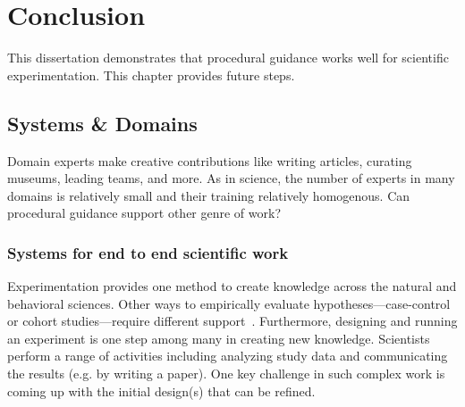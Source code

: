 
\chapter{Conclusion}

This dissertation demonstrates that procedural guidance works well for scientific experimentation. This chapter provides future steps.


\section{Systems \& Domains} 

Domain experts make creative contributions like writing articles, curating museums, leading teams, and more. As in science, the number of experts in many domains is relatively small and their training relatively homogenous.  Can procedural guidance support other genre of work?

\subsection{Systems for end to end scientific work}
Experimentation provides one method to create knowledge across the natural and behavioral sciences. Other ways to empirically evaluate hypotheses---case-control or cohort studies---require different support~\cite{Murad125}. Furthermore, designing and running an experiment is one step among many in creating new knowledge. Scientists perform a range of activities including analyzing study data and communicating the results (e.g. by writing a paper). One key challenge in such complex work is coming up with the initial design(s) that can be refined.

